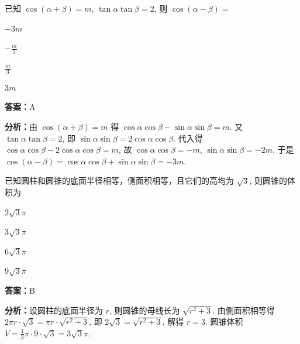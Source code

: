 \begin{question}[points=5]
已知 $\cos(\alpha + \beta) = m$, $\tan \alpha \tan \beta = 2$, 则 $\cos(\alpha - \beta) =$
\begin{choices}
  \item $-3m$
  \item $-\frac{m}{3}$
  \item $\frac{m}{3}$
  \item $3m$
\end{choices}
\begin{solution}
\textbf{答案：}A

\textbf{分析：}由 $\cos(\alpha + \beta) = m$ 得 $\cos\alpha \cos\beta - \sin\alpha \sin\beta = m$. 又 $\tan\alpha \tan\beta = 2$, 即 $\sin\alpha \sin\beta = 2 \cos\alpha \cos\beta$. 代入得 $\cos\alpha \cos\beta - 2\cos\alpha \cos\beta = m$, 故 $\cos\alpha \cos\beta = -m$, $\sin\alpha \sin\beta = -2m$. 于是 $\cos(\alpha - \beta) = \cos\alpha \cos\beta + \sin\alpha \sin\beta = -3m$.
\end{solution}
\end{question}

\begin{question}[points=5]
已知圆柱和圆锥的底面半径相等，侧面积相等，且它们的高均为 $\sqrt{3}$, 则圆锥的体积为
\begin{choices}
  \item $2\sqrt{3}\pi$
  \item $3\sqrt{3}\pi$
  \item $6\sqrt{3}\pi$
  \item $9\sqrt{3}\pi$
\end{choices}
\begin{solution}
\textbf{答案：}B

\textbf{分析：}设圆柱的底面半径为 $r$, 则圆锥的母线长为 $\sqrt{r^2 + 3}$. 由侧面积相等得 $2\pi r \cdot \sqrt{3} = \pi r \cdot \sqrt{r^2 + 3}$, 即 $2\sqrt{3} = \sqrt{r^2 + 3}$, 解得 $r = 3$. 圆锥体积 $V = \frac{1}{3} \pi \cdot 9 \cdot \sqrt{3} = 3\sqrt{3}\pi$.
\end{solution}
\end{question}

